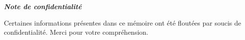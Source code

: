 \thispagestyle{empty}
\vspace*{2cm}
\begin{center}
    \huge{\textbf{\textit{Note de confidentialité}}}
\end{center}
\bigskip
\medskip 
\vspace{2cm}
\begin{center}
\large{
Certaines informations présentes dans ce mémoire ont été floutées par soucis de confidentialité. Merci pour votre compréhension.
}
\end{center}



\clearpage
